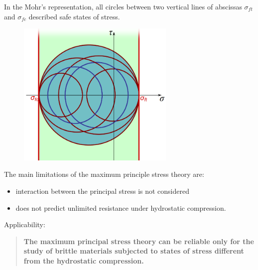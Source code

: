 \documentclass[class=report, crop=false, 12pt,a4paper]{standalone}
\begin{document}
In the Mohr's representation, all circles between two vertical lines of abscissas $\sigma_{ft}$ and $\sigma_{fc}$ described safe states of stress.
\begin{figure}[H]
  \centering
  \includegraphics[height = 7cm]{../img/diagram17.png}
  \caption{}
\end{figure}
The main limitations of the maximum principle stress theory are:
\begin{itemize}
  \item interaction between the principal stress is not considered
  \item does not predict unlimited resistance under hydrostatic compression. 
\end{itemize}
Applicability:
\begin{quotation}
  \textbf{The maximum principal stress theory can be reliable only for the study of brittle materials subjected to states of stress different from the hydrostatic compression.}
\end{quotation}
\end{document}
